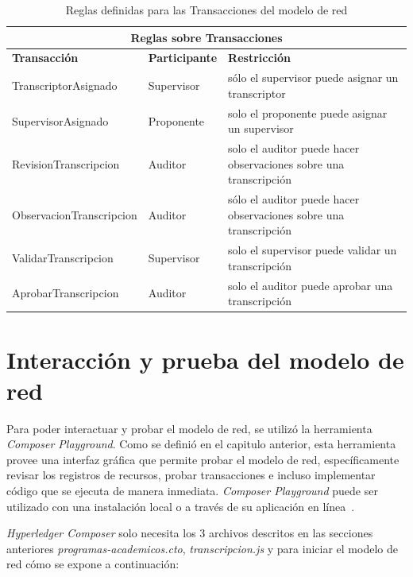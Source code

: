 \begin{table}[H]
    \centering
    \caption{Reglas definidas para las Transacciones del modelo de red}
    \begin{tabular}{|m{10em}|m{6em}|m{14em}|}
    \hline
        \multicolumn{3}{|c|}{Reglas sobre Transacciones}\\
    \hline
        \textbf{Transacción} & \textbf{Participante} & \textbf{Restricción}  \\
    \hline
         TranscriptorAsignado & Supervisor & sólo el supervisor puede asignar un transcriptor \\
         \hline
         SupervisorAsignado & Proponente & solo el proponente puede asignar un supervisor\\
         \hline
         RevisionTranscripcion & Auditor & solo el auditor puede hacer observaciones sobre una transcripción \\
         \hline
         ObservacionTranscripcion & Auditor & sólo el auditor puede hacer observaciones sobre una transcripción \\
         \hline
         ValidarTranscripcion & Supervisor& solo el supervisor puede validar un transcripción\\
         \hline
         AprobarTranscripcion & Auditor & solo el auditor puede aprobar una transcripción\\
    \hline
    \end{tabular}
    \label{tabla:reglas_transacciones}
\end{table}

\section{Interacción y prueba del modelo de red}

Para poder interactuar y probar el modelo de red, se utilizó la herramienta \textit{Composer Playground}. Como se definió en el capitulo anterior, esta herramienta provee una interfaz gráfica que permite probar el modelo de red, específicamente revisar los registros de recursos, probar transacciones e incluso implementar código que se ejecuta de manera inmediata. \textit{Composer Playground} puede ser utilizado con  una instalación local o a través de su aplicación en línea~\cite{composerPlayground}.

\textit{Hyperledger Composer} solo necesita los 3 archivos descritos en las secciones anteriores \textit{programas-academicos.cto}, \textit{transcripcion.js} y  para iniciar el modelo de red cómo se expone a continuación:

